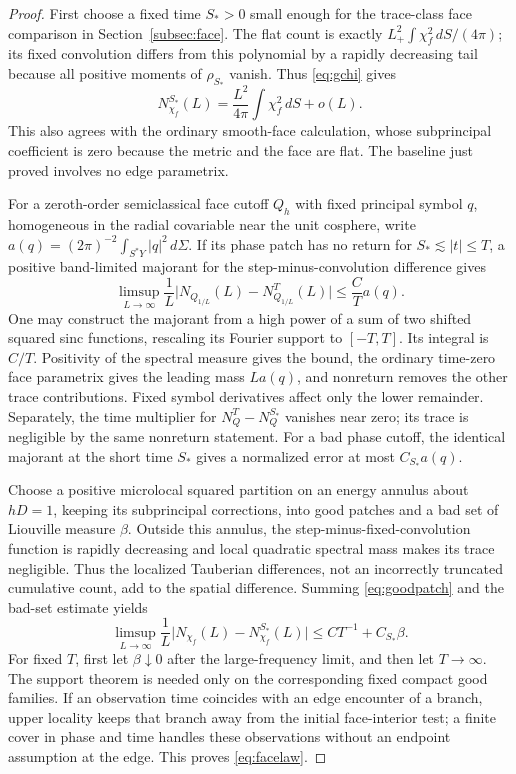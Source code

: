 \documentclass[11pt]{amsart}
\numberwithin{equation}{section}
\theoremstyle{remark}
\begin{document}
\begin{proof}
First choose a fixed time $S_*>0$ small enough for the trace-class face comparison in Section~\ref{subsec:face}. The flat count is exactly $L_+^2\int\chi_f^2\,dS/(4\pi)$; its fixed convolution differs from this polynomial by a rapidly decreasing tail because all positive moments of $\rho_{S_*}$ vanish. Thus \eqref{eq:gchi} gives
\begin{equation}\label{eq:facesmooth}
N^{S_*}_{\chi_f}(L)=\frac{L^2}{4\pi}\int\chi_f^2\,dS+o(L) .
\end{equation}
This also agrees with the ordinary smooth-face calculation, whose subprincipal coefficient is zero because the metric and the face are flat. The baseline just proved involves no edge parametrix.

For a zeroth-order semiclassical face cutoff $Q_h$ with fixed principal symbol $q$, homogeneous in the radial covariable near the unit cosphere, write $a(q)=(2\pi)^{-2}\int_{S^*Y}|q|^2\,d\Sigma$. If its phase patch has no return for $S_*\lesssim|t|\le T$, a positive band-limited majorant for the step-minus-convolution difference gives
\begin{equation}\label{eq:goodpatch}
\limsup_{L\to\infty}\frac1L\big|N_{Q_{1/L}}(L)-N^T_{Q_{1/L}}(L)\big|\le\frac{C}{T}a(q) .
\end{equation}
One may construct the majorant from a high power of a sum of two shifted squared sinc functions, rescaling its Fourier support to $[-T,T]$. Its integral is $C/T$. Positivity of the spectral measure gives the bound, the ordinary time-zero face parametrix gives the leading mass $La(q)$, and nonreturn removes the other trace contributions. Fixed symbol derivatives affect only the lower remainder. Separately, the time multiplier for $N^T_Q-N^{S_*}_Q$ vanishes near zero; its trace is negligible by the same nonreturn statement. For a bad phase cutoff, the identical majorant at the short time $S_*$ gives a normalized error at most $C_{S_*}a(q)$.

Choose a positive microlocal squared partition on an energy annulus about $hD=1$, keeping its subprincipal corrections, into good patches and a bad set of Liouville measure $\beta$. Outside this annulus, the step-minus-fixed-convolution function is rapidly decreasing and local quadratic spectral mass makes its trace negligible. Thus the localized Tauberian differences, not an incorrectly truncated cumulative count, add to the spatial difference. Summing \eqref{eq:goodpatch} and the bad-set estimate yields
\begin{equation}\label{eq:facetauber}
\limsup_{L\to\infty}\frac1L\big|N_{\chi_f}(L)-N^{S_*}_{\chi_f}(L)\big|\le CT^{-1}+C_{S_*}\beta .
\end{equation}
For fixed $T$, first let $\beta\downarrow0$ after the large-frequency limit, and then let $T\to\infty$. The support theorem is needed only on the corresponding fixed compact good families. If an observation time coincides with an edge encounter of a branch, upper locality keeps that branch away from the initial face-interior test; a finite cover in phase and time handles these observations without an endpoint assumption at the edge. This proves \eqref{eq:facelaw}.


\end{proof}
\end{document}
